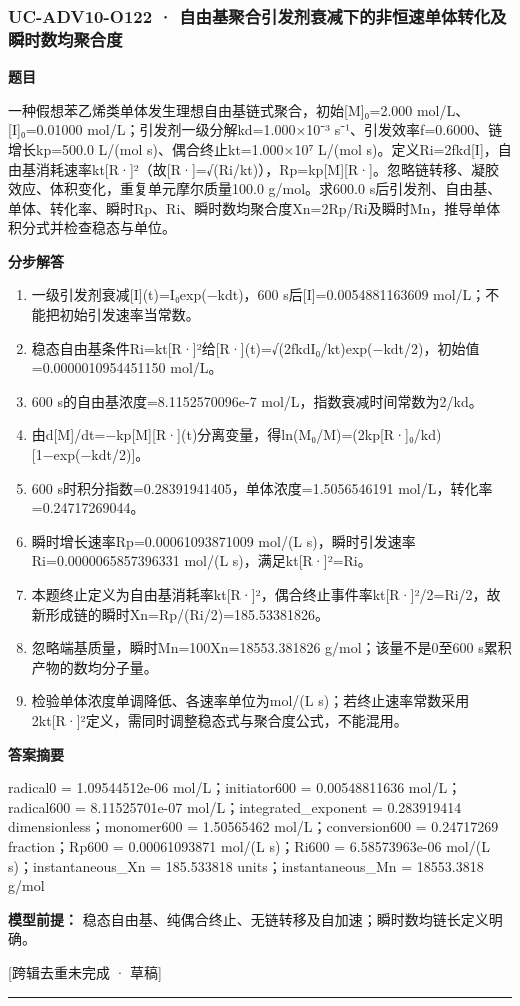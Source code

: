 \documentclass[UTF8,11pt,a4paper]{ctexart}
\begin{document}
\subsubsection*{UC-ADV10-O122 · 自由基聚合引发剂衰减下的非恒速单体转化及瞬时数均聚合度}
\noindent\textbf{题目}\par
一种假想苯乙烯类单体发生理想自由基链式聚合，初始[M]₀=2.000 mol/L、[I]₀=0.01000 mol/L；引发剂一级分解kd=1.000×10⁻³ s⁻¹、引发效率f=0.6000、链增长kp=500.0 L/(mol s)、偶合终止kt=1.000×10⁷ L/(mol s)。定义Ri=2fkd[I]，自由基消耗速率kt[R·]²（故[R·]=√(Ri/kt)），Rp=kp[M][R·]。忽略链转移、凝胶效应、体积变化，重复单元摩尔质量100.0 g/mol。求600.0 s后引发剂、自由基、单体、转化率、瞬时Rp、Ri、瞬时数均聚合度Xn=2Rp/Ri及瞬时Mn，推导单体积分式并检查稳态与单位。\par
\medskip\noindent\textbf{分步解答}
\begin{enumerate}
\item 一级引发剂衰减[I](t)=I₀exp(−kdt)，600 s后[I]=0.0054881163609 mol/L；不能把初始引发速率当常数。
\item 稳态自由基条件Ri=kt[R·]²给[R·](t)=√(2fkdI₀/kt)exp(−kdt/2)，初始值=0.0000010954451150 mol/L。
\item 600 s的自由基浓度=8.1152570096e-7 mol/L，指数衰减时间常数为2/kd。
\item 由d[M]/dt=−kp[M][R·](t)分离变量，得ln(M₀/M)=(2kp[R·]₀/kd)[1−exp(−kdt/2)]。
\item 600 s时积分指数=0.28391941405，单体浓度=1.5056546191 mol/L，转化率=0.24717269044。
\item 瞬时增长速率Rp=0.00061093871009 mol/(L s)，瞬时引发速率Ri=0.0000065857396331 mol/(L s)，满足kt[R·]²=Ri。
\item 本题终止定义为自由基消耗率kt[R·]²，偶合终止事件率kt[R·]²/2=Ri/2，故新形成链的瞬时Xn=Rp/(Ri/2)=185.53381826。
\item 忽略端基质量，瞬时Mn=100Xn=18553.381826 g/mol；该量不是0至600 s累积产物的数均分子量。
\item 检验单体浓度单调降低、各速率单位为mol/(L s)；若终止速率常数采用2kt[R·]²定义，需同时调整稳态式与聚合度公式，不能混用。
\end{enumerate}
\noindent\textbf{答案摘要}\par
radical0 = 1.09544512e-06 mol/L；initiator600 = 0.00548811636 mol/L；radical600 = 8.11525701e-07 mol/L；integrated\_exponent = 0.283919414 dimensionless；monomer600 = 1.50565462 mol/L；conversion600 = 0.24717269 fraction；Rp600 = 0.00061093871 mol/(L s)；Ri600 = 6.58573963e-06 mol/(L s)；instantaneous\_Xn = 185.533818 units；instantaneous\_Mn = 18553.3818 g/mol\par
\noindent\textbf{模型前提：}
稳态自由基、纯偶合终止、无链转移及自加速；瞬时数均链长定义明确。\par
\noindent\textcolor{red!65!black}{[跨辑去重未完成 · 草稿]} \par
\medskip\hrule\medskip
\end{document}
